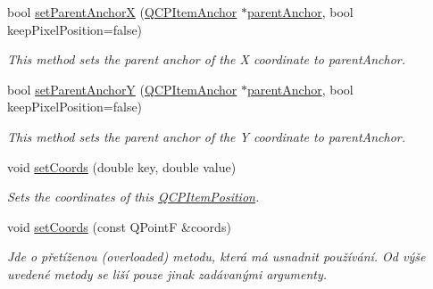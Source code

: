 \begin{DoxyCompactItemize}
bool \hyperlink{classQCPItemPosition_add71461a973927c74e42179480916d9c}{set\+Parent\+Anchor\+X} (\hyperlink{classQCPItemAnchor}{Q\+C\+P\+Item\+Anchor} $\ast$\hyperlink{classQCPItemPosition_a7b4ffab9946945c0e11cd2352dc2e042}{parent\+Anchor}, bool keep\+Pixel\+Position=false)
\begin{DoxyCompactList}\small\item\em This method sets the parent anchor of the X coordinate to {\itshape parent\+Anchor}. \end{DoxyCompactList}\item 
bool \hyperlink{classQCPItemPosition_add5ec1db9d19cec58a3b5c9e0a0c3f9d}{set\+Parent\+Anchor\+Y} (\hyperlink{classQCPItemAnchor}{Q\+C\+P\+Item\+Anchor} $\ast$\hyperlink{classQCPItemPosition_a7b4ffab9946945c0e11cd2352dc2e042}{parent\+Anchor}, bool keep\+Pixel\+Position=false)
\begin{DoxyCompactList}\small\item\em This method sets the parent anchor of the Y coordinate to {\itshape parent\+Anchor}. \end{DoxyCompactList}\item 
void \hyperlink{classQCPItemPosition_aa988ba4e87ab684c9021017dcaba945f}{set\+Coords} (double key, double value)
\begin{DoxyCompactList}\small\item\em Sets the coordinates of this \hyperlink{classQCPItemPosition}{Q\+C\+P\+Item\+Position}. \end{DoxyCompactList}\item 
\hypertarget{classQCPItemPosition_acc70b3abc143287f806e5f154e5e07b0}{}void \hyperlink{classQCPItemPosition_acc70b3abc143287f806e5f154e5e07b0}{set\+Coords} (const Q\+Point\+F \&coords)\label{classQCPItemPosition_acc70b3abc143287f806e5f154e5e07b0}

\begin{DoxyCompactList}\small\item\em Jde o přetíženou (overloaded) metodu, která má usnadnit používání. Od výše uvedené metody se liší pouze jinak zadávanými argumenty.


\end{DoxyCompactList}
\end{DoxyCompactItemize}
